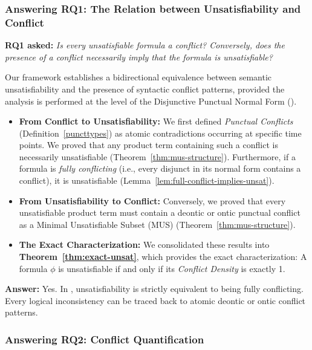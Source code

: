 \subsubsection{Answering RQ1: The Relation between Unsatisfiability and Conflict}

\textbf{RQ1 asked:} \emph{Is every unsatisfiable formula a conflict? Conversely, does the presence of a conflict necessarily imply that the formula is unsatisfiable?}

Our framework establishes a bidirectional equivalence between semantic unsatisfiability and the presence of syntactic conflict patterns, provided the analysis is performed at the level of the Disjunctive Punctual Normal Form (\dpnf).

\begin{itemize}
    \item \textbf{From Conflict to Unsatisfiability:} We first defined \emph{Punctual Conflicts} (Definition~\ref{puncttypes}) as atomic contradictions occurring at specific time points. We proved that any product term containing such a conflict is necessarily unsatisfiable (Theorem~\ref{thm:mus-structure}). Furthermore, if a formula is \emph{fully conflicting} (i.e., every disjunct in its normal form contains a conflict), it is unsatisfiable (Lemma~\ref{lem:full-conflict-implies-unsat}).
    
    \item \textbf{From Unsatisfiability to Conflict:} Conversely, we proved that every unsatisfiable product term must contain a deontic or ontic punctual conflict as a Minimal Unsatisfiable Subset (MUS) (Theorem~\ref{thm:mus-structure}).
    
    \item \textbf{The Exact Characterization:} We consolidated these results into \textbf{Theorem~\ref{thm:exact-unsat}}, which provides the exact characterization: A formula $\phi$ is unsatisfiable if and only if its \emph{Conflict Density} is exactly 1.
\end{itemize}

\noindent \textbf{Answer:} Yes. In \TDDLfm, unsatisfiability is strictly equivalent to being fully conflicting. Every logical inconsistency can be traced back to atomic deontic or ontic conflict patterns.

\subsubsection{Answering RQ2: Conflict Quantification}

